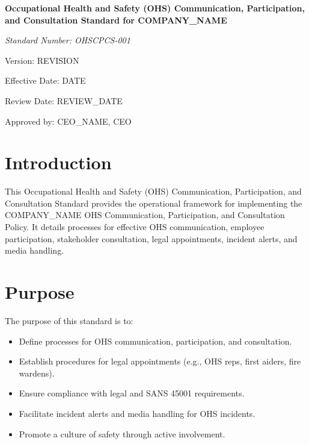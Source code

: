 \documentclass[12pt]{article}
\begin{document}
\begin{titlepage}
    \centering
    \vspace*{2cm}
    {\LARGE\bfseries Occupational Health and Safety (OHS) Communication, Participation, and Consultation Standard for {{COMPANY_NAME}}\par}
    \vspace{1cm}
    {\large\itshape Standard Number: OHSCPCS-001\par}
    \vspace{0.5cm}
    {\normalsize Version: {{REVISION}}\par}
    \vspace{0.5cm}
    {\normalsize Effective Date: {{DATE}}\par}
    \vspace{0.5cm}
    {\normalsize Review Date: {{REVIEW_DATE}}\par}
    \vspace{2cm}
    {\normalsize Approved by: {{CEO_NAME}}, CEO\par}
\end{titlepage}

\section{Introduction}
This Occupational Health and Safety (OHS) Communication, Participation, and Consultation Standard provides the operational framework for implementing the {{COMPANY_NAME}} OHS Communication, Participation, and Consultation Policy. It details processes for effective OHS communication, employee participation, stakeholder consultation, legal appointments, incident alerts, and media handling.

\section{Purpose}
The purpose of this standard is to:
\begin{itemize}
    \item Define processes for OHS communication, participation, and consultation.
    \item Establish procedures for legal appointments (e.g., OHS reps, first aiders, fire wardens).
    \item Ensure compliance with legal and SANS 45001 requirements.
    \item Facilitate incident alerts and media handling for OHS incidents.
    \item Promote a culture of safety through active involvement.
\end{itemize}
\end{document}
